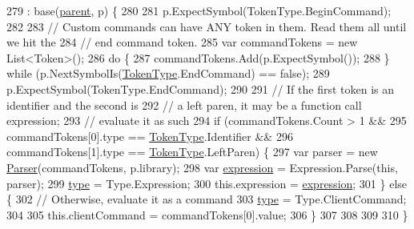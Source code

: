 \begin{DoxyCode}
279                                                                : base(\hyperlink{a00077_af313a82103fcc2ff5a177dbb06b92f7b}{parent}, p) \{
280 
281                 p.ExpectSymbol(TokenType.BeginCommand);
282 
283                 \textcolor{comment}{// Custom commands can have ANY token in them. Read them all until we hit the}
284                 \textcolor{comment}{// end command token.}
285                 var commandTokens = \textcolor{keyword}{new} List<Token>();
286                 \textcolor{keywordflow}{do} \{
287                     commandTokens.Add(p.ExpectSymbol());
288                 \} \textcolor{keywordflow}{while} (p.NextSymbolIs(\hyperlink{a00040_a301aa7c866593a5b625a8fc158bbeace}{TokenType}.EndCommand) == \textcolor{keyword}{false});
289                 p.ExpectSymbol(TokenType.EndCommand);
290 
291                 \textcolor{comment}{// If the first token is an identifier and the second is}
292                 \textcolor{comment}{// a left paren, it may be a function call expression;}
293                 \textcolor{comment}{// evaluate it as such}
294                 \textcolor{keywordflow}{if} (commandTokens.Count > 1 && 
295                     commandTokens[0].type == \hyperlink{a00040_a301aa7c866593a5b625a8fc158bbeace}{TokenType}.Identifier &&
296                     commandTokens[1].type == \hyperlink{a00040_a301aa7c866593a5b625a8fc158bbeace}{TokenType}.LeftParen) \{            
297                     var parser = \textcolor{keyword}{new} \hyperlink{a00078_acd2714b911fb5e7c38f0e07a9dc1af58}{Parser}(commandTokens, p.library);
298                     var \hyperlink{a00046_a4250d192d5b58e2404a14c68eb616f16}{expression} = Expression.Parse(\textcolor{keyword}{this}, parser);
299                     \hyperlink{a00046_a5ef3bc96812be224d91548bfcdfd4b92}{type} = Type.Expression;
300                     this.expression = \hyperlink{a00046_a4250d192d5b58e2404a14c68eb616f16}{expression};
301                 \} \textcolor{keywordflow}{else} \{
302                     \textcolor{comment}{// Otherwise, evaluate it as a command}
303                     \hyperlink{a00046_a5ef3bc96812be224d91548bfcdfd4b92}{type} = Type.ClientCommand;
304 
305                     this.clientCommand = commandTokens[0].value;
306                 \}
307 
308 
309 
310             \}
\end{DoxyCode}


